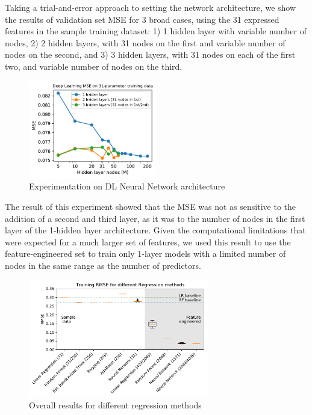 \documentclass[11pt]{article}
\begin{document}
\begin{enumerate}
\begin{enumerate}
Taking a trial-and-error approach to setting the network architecture, we show the results of validation set MSE for 3 broad cases, using the 31 expressed features in the sample training dataset: 1) 1 hidden layer with variable number of nodes, 2) 2 hidden layers, with 31 nodes on the first and variable number of nodes on the second, and 3) 3 hidden layers, with 31 nodes on each of the first two, and variable number of nodes on the third.

\begin{figure}[h]
\centering
\includegraphics[width=0.5\textwidth]{Antonio_DL_mse.pdf}
\caption{Experimentation on DL Neural Network architecture}
\label{fig:DL_mse}
\end{figure}

The result of this experiment showed that the MSE was not as sensitive to the addition of a second and third layer, as it was to the number of nodes in the first layer of the 1-hidden layer architecture. Given the computational limitations that were expected for a much larger set of features, we used this result to use the feature-engineered set to train only 1-layer models with a limited number of nodes in the same range as the number of predictors. \\


\end{enumerate}


\end{enumerate}


\begin{figure}[h]
\centering
\includegraphics[width=0.7\textwidth]{Results_AC.pdf}
\caption{Overall results for different regression methods}
\label{fig:his_feature_importance}
\end{figure}
\end{document}
